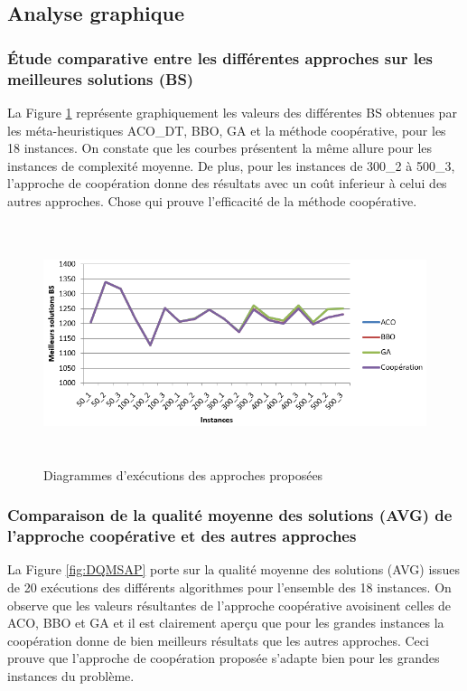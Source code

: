 \subsection{Analyse graphique}

\subsubsection{Étude comparative entre les différentes approches sur les meilleures solutions (BS) }

La Figure \ref{fig:DEAP} représente graphiquement les valeurs des différentes BS obtenues
par les méta-heuristiques  ACO\_DT, BBO, GA et la méthode coopérative, pour les 18 instances. On constate que les courbes présentent la même allure pour les instances de complexité moyenne. De plus, pour les instances de 300\_2 à 500\_3, l’approche de coopération  donne des résultats avec un coût inferieur à celui des autres approches. Chose qui prouve l’efficacité de la méthode coopérative.

\begin{figure}[H]
	\centering
	\includegraphics[width=16cm,height=7cm]{Chap5/5.png}
	\caption{Diagrammes d’exécutions des approches proposées}
	\label{fig:DEAP}
\end{figure}



\subsubsection{Comparaison de la qualité moyenne des solutions (AVG) de l’approche coopérative  et des autres approches}

La Figure \ref{fig:DQMSAP} porte sur la qualité moyenne des solutions (AVG) issues de 20 exécutions des différents algorithmes pour l’ensemble des 18 instances. On observe
que les valeurs résultantes de l’approche coopérative avoisinent celles de ACO, BBO  et GA et il est clairement aperçu que pour les grandes instances  la coopération donne de bien meilleurs résultats que les autres approches. Ceci prouve que l’approche de coopération proposée  s'adapte bien pour les grandes instances du problème. 


